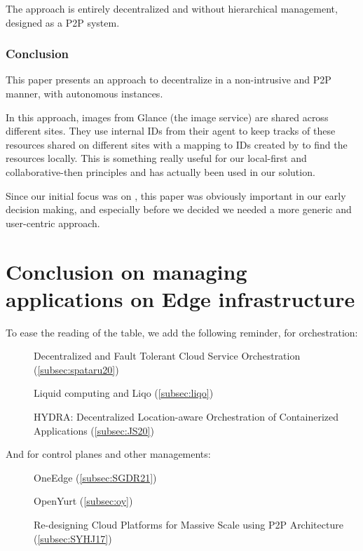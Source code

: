 The approach is entirely decentralized and without hierarchical
management, designed as a \acrshort{P2P} system.



\subsubsection*{Conclusion}

This paper presents an approach to decentralize \os in a
non-intrusive and \acrshort{P2P} manner, with autonomous instances.

In this approach, images from Glance (the image service) are shared
across different sites.
%
They use internal IDs from their agent to keep tracks of these
resources shared on different sites with a mapping to IDs created by
\os to find the resources locally.
%
This is something really useful for our local-first and
collaborative-then principles and has actually been used in our
solution.

%
Since our initial focus was on \os, this paper was obviously
important in our early decision making, and especially before we
decided we needed a more generic and user-centric approach.



\section{Conclusion on managing applications on Edge infrastructure}
\label{sec:soa-em-conclusion}

To ease the reading of the table, we add the following reminder, for orchestration:
\begin{description}
\item [\cite{Spataru20}] Decentralized and Fault Tolerant Cloud Service Orchestration (\autoref{subsec:spataru20})
\item [\cite{IRPCM22}] Liquid computing and Liqo (\autoref{subsec:liqo})
\item [\cite{JS20}] HYDRA: Decentralized Location-aware Orchestration of Containerized Applications (\autoref{subsec:JS20})
\end{description}
And for control planes and other managements:
\begin{description}
\item [\cite{SGDR21}] OneEdge (\autoref{subsec:SGDR21})
\item [\cite{openyurt}] OpenYurt (\autoref{subsec:oy})
\item [\cite{SYHJ17}] Re-designing Cloud Platforms for Massive Scale using P2P Architecture (\autoref{subsec:SYHJ17})
\end{description}

